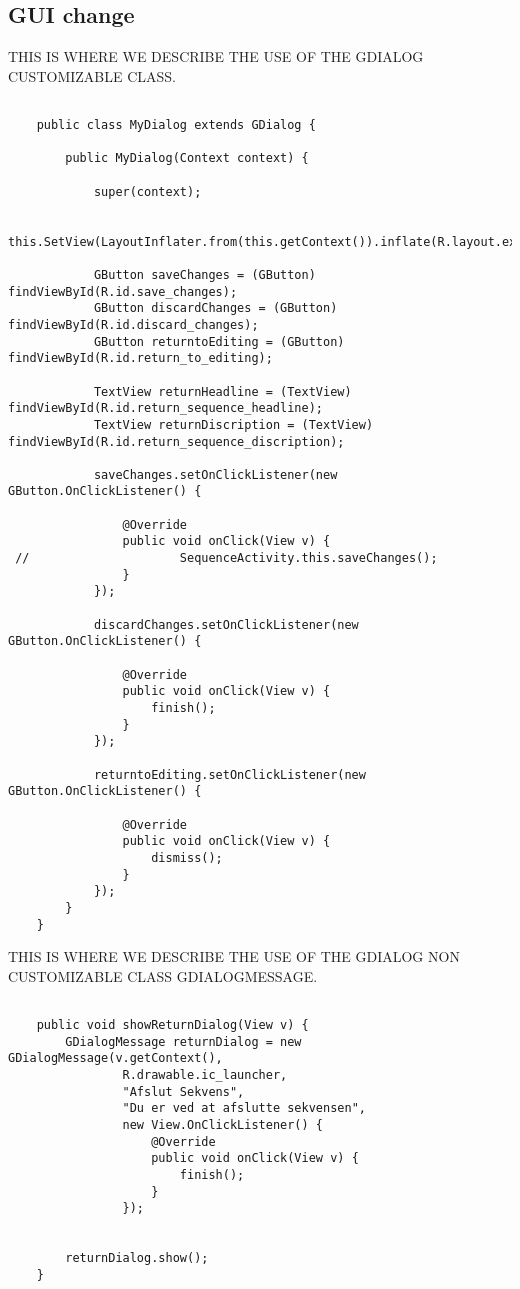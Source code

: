 \subsection{GUI change} \label{para:spr2_resolved_issues_GUI_change}

THIS IS WHERE WE DESCRIBE THE USE OF THE GDIALOG CUSTOMIZABLE CLASS. 

\begin{lstlisting}

    public class MyDialog extends GDialog {

        public MyDialog(Context context) {

            super(context);

            this.SetView(LayoutInflater.from(this.getContext()).inflate(R.layout.exit_sequence_dialog,null));

            GButton saveChanges = (GButton) findViewById(R.id.save_changes);
            GButton discardChanges = (GButton) findViewById(R.id.discard_changes);
            GButton returntoEditing = (GButton) findViewById(R.id.return_to_editing);

            TextView returnHeadline = (TextView) findViewById(R.id.return_sequence_headline);
            TextView returnDiscription = (TextView) findViewById(R.id.return_sequence_discription);

            saveChanges.setOnClickListener(new GButton.OnClickListener() {

                @Override
                public void onClick(View v) {
 //                     SequenceActivity.this.saveChanges();
                }
            });

            discardChanges.setOnClickListener(new GButton.OnClickListener() {

                @Override
                public void onClick(View v) {
                    finish();
                }
            });

            returntoEditing.setOnClickListener(new GButton.OnClickListener() {

                @Override
                public void onClick(View v) {
                    dismiss();
                }
            });
        }
    }

\end{lstlisting}

THIS IS WHERE WE DESCRIBE THE USE OF THE GDIALOG NON CUSTOMIZABLE CLASS GDIALOGMESSAGE. 

\begin{lstlisting}

    public void showReturnDialog(View v) {
        GDialogMessage returnDialog = new GDialogMessage(v.getContext(),
                R.drawable.ic_launcher,
                "Afslut Sekvens",
                "Du er ved at afslutte sekvensen",
                new View.OnClickListener() {
                    @Override
                    public void onClick(View v) {
                        finish();
                    }
                });


        returnDialog.show();
    }

\end{lstlisting}